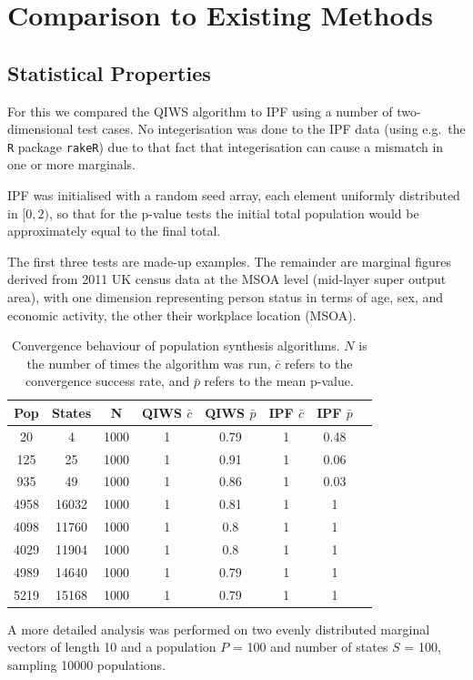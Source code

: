 \documentclass{JASSS}
\begin{document}
\section{Comparison to Existing
Methods}\label{comparison-to-existing-methods}

\subsection{Statistical Properties}\label{statistical-properties}

For this we compared the QIWS algorithm to IPF using a number of
two-dimensional test cases. No integerisation was done to the IPF data (using e.g.~the \texttt{R}
package \texttt{rakeR}) due to that fact that integerisation can cause a
mismatch in one or more marginals.

IPF was initialised with a random seed array, each element uniformly
distributed in \([0,2)\), so that for the p-value tests the initial total population would be approximately equal to the final total.

The first three tests are made-up examples. The remainder are marginal
figures derived from 2011 UK census data at the MSOA level (mid-layer
super output area), with one dimension representing person status in
terms of age, sex, and economic activity, the other their workplace
location (MSOA).

\begin{table}[!t]
	\centering
	\begin{tabular}{c|c|c|c|c|c|c|c}
	\toprule
	Pop & States & N & QIWS \(\bar{c}\) & QIWS \(\bar{p}\) & IPF \(\bar{c}\) & IPF \(\bar{p}\)\tabularnewline
	\midrule
	20 & 4 & 1000 & 1 & 0.79 & 1 & 0.48\tabularnewline
	125 & 25 & 1000 & 1 & 0.91 & 1 & 0.06\tabularnewline
	935 & 49 & 1000 & 1 & 0.86 & 1 & 0.03\tabularnewline
	4958 & 16032 & 1000 & 1 & 0.81 & 1 & 1\tabularnewline
	4098 & 11760 & 1000 & 1 & 0.8 & 1 & 1\tabularnewline
	4029 & 11904 & 1000 & 1 & 0.8 & 1 & 1\tabularnewline
	4989 & 14640 & 1000 & 1 & 0.79 & 1 & 1\tabularnewline
	5219 & 15168 & 1000 & 1 & 0.79 & 1 & 1\tabularnewline
	\bottomrule
	\end{tabular}
	\caption{Convergence behaviour of population synthesis algorithms. \(N\)
	is the number of times the algorithm was run, \(\bar{c}\) refers to the
	convergence success rate, and \(\bar{p}\) refers to the mean p-value.}
	\label{tab1}	
\end{table}

A more detailed analysis was performed on two evenly distributed
marginal vectors of length 10 and a population \(P\) = 100 and number of
states \(S\) = 100, sampling 10000 populations.
\end{document}
